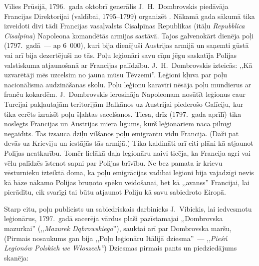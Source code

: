 \documentclass[twoside,a5paper,12pt,fleqn,openany]{extbook}
\newcommand{\pltxti}[1]{\textit{\textpolish{#1}}}
\newcommand{\latxti}[1]{\textit{\textlatin{#1}}}
\begin{document}
Vīlies Prūsijā, 1796.~gada oktobrī ģenerālis J.~H.~Dombrovskis piedāvāja Francijas Direktorijai (valdībai, 1795--1799) organizēt . Nākamā gada sākumā tika izveidoti divi tādi Francijas vasaļvalsts Cisalpīnas Republikas (itāļu \latxti{Repubblica Cisalpina}) Napoleona komandētās armijas sastāvā. Tajos galvenokārt dienēja poļi (1797.~gadā~--- ap 6~000), kuri bija dienējuši Austrijas armijā un saņemti gūstā vai arī bija dezertējuši no tās. Poļu leģionāri savu cīņu jēgu saskatīja Polijas valstiskuma atjaunošanā ar Francijas palīdzību. J.~H.~Dombrovskis izteicās: ,,Kā uzvarētāji mēs uzcelsim no jauna mūsu Tēvzemi''. Leģioni kļuva par poļu nacionālisma audzināšanas skolu. Poļu leģionu karavīri nēsāja poļu mundierus ar franču kokardēm. J.~Dombrovskis ierosināja Napoleonam nosūtīt leģionus caur Turcijai pakļautajām teritorijām Balkānos uz Austrijai piederošo Galīciju, kur tika cerēts izraisīt poļu šļahtas sacelšanos. Tiesa, drīz (1797.~gada aprīlī) tika noslēgts Francijas un Austrijas miera līgums, kurš leģionāriem nāca pilnīgi negaidīts. Tas izsauca dziļu vilšanos poļu emigrantu vidū Francijā. (Daži pat devās uz Krieviju un iestājās tās armijā.) Tika kaldināti arī citi plāni kā atjaunot Polijas neatkarību. Tomēr lielākā daļa leģionāru naivi ticēja, ka Francija agri vai vēlu palīdzēs īstenot sapni par Polijas brīvību. Ne bez pamata ir krievu vēsturnieku izteiktā doma, ka poļu emigrācijas vadībai leģioni bija vajadzīgi nevis kā bāze nākamo Polijas bruņoto spēku veidošanai, bet kā ,,avanss'' Francijai, lai pierādītu, cik svarīgi tai būtu atjaunot Poliju kā savu sabiedroto Eiropā.

Starp citu, poļu publicists un sabiedriskais darbinieks J.~Vibickis, lai iedvesmotu leģionārus, 1797.~gadā sacerēja vārdus plaši pazīstamajai ,,Dombrovska mazurkai'' (,,\pltxti{Mazurek Dąbrowskiego}''), sauktai arī par Dombrovska maršu, (Pirmais nosaukums gan bija ,,Poļu leģionāru Itālijā dziesma''~--- ,,\pltxti{Pieśń Legionów Polskich we Włoszech''}) Dziesmas pirmais pants un piedziedājums skanēja:

\vspace{1.5em}
\end{document}
